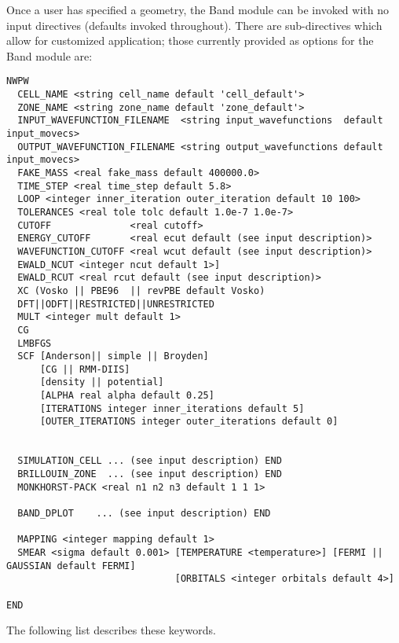 Once a user has specified a geometry, the Band module can be invoked with no input directives (defaults invoked throughout).  There are sub-directives which allow for customized application; those currently provided as options for the Band module are:
\begin{verbatim}
NWPW
  CELL_NAME <string cell_name default 'cell_default'>
  ZONE_NAME <string zone_name default 'zone_default'>
  INPUT_WAVEFUNCTION_FILENAME  <string input_wavefunctions  default input_movecs>
  OUTPUT_WAVEFUNCTION_FILENAME <string output_wavefunctions default input_movecs>
  FAKE_MASS <real fake_mass default 400000.0>
  TIME_STEP <real time_step default 5.8>
  LOOP <integer inner_iteration outer_iteration default 10 100>
  TOLERANCES <real tole tolc default 1.0e-7 1.0e-7>
  CUTOFF              <real cutoff>
  ENERGY_CUTOFF       <real ecut default (see input description)>
  WAVEFUNCTION_CUTOFF <real wcut default (see input description)>
  EWALD_NCUT <integer ncut default 1>]
  EWALD_RCUT <real rcut default (see input description)>
  XC (Vosko || PBE96  || revPBE default Vosko)
  DFT||ODFT||RESTRICTED||UNRESTRICTED
  MULT <integer mult default 1>
  CG
  LMBFGS
  SCF [Anderson|| simple || Broyden]
      [CG || RMM-DIIS]
      [density || potential]
      [ALPHA real alpha default 0.25]
      [ITERATIONS integer inner_iterations default 5]
      [OUTER_ITERATIONS integer outer_iterations default 0]

  
  SIMULATION_CELL ... (see input description) END
  BRILLOUIN_ZONE  ... (see input description) END
  MONKHORST-PACK <real n1 n2 n3 default 1 1 1>

  BAND_DPLOT    ... (see input description) END

  MAPPING <integer mapping default 1>
  SMEAR <sigma default 0.001> [TEMPERATURE <temperature>] [FERMI || GAUSSIAN default FERMI] 
                              [ORBITALS <integer orbitals default 4>]

END 
\end{verbatim}
The following list describes these keywords.
